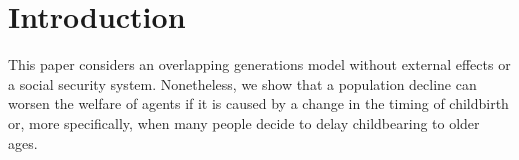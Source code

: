 \documentclass{MBE}%
\begin{document}

\maketitle



\section{{Introduction}\label{sec:Intro}}


This paper considers an overlapping generations model without external effects or a social
security system. Nonetheless, we show that a population decline can worsen the welfare of agents
if it is caused by a change in the timing of childbirth or, more specifically, when many people
decide to delay childbearing to older ages.
\end{document}
